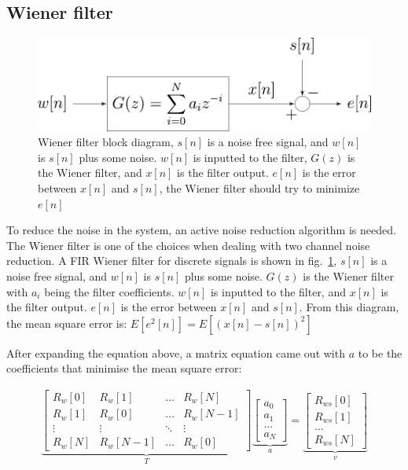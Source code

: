\subsection{Wiener filter}

\begin{figure}[H]
\centerline{\includegraphics[scale=0.5]{3-literature/Wiener_block.pdf}}
\caption{Wiener filter block diagram, $s[n]$ is a noise free signal, and $w[n]$ is $s[n]$ plus some noise.  $w[n]$ is inputted to the filter, $G(z)$ is the Wiener filter, and $x[n]$ is the filter output.  $e[n]$ is the error between $x[n]$ and $s[n]$, the Wiener filter should try to minimize $e[n]$}
\label{fig_Wiener_block}
\end{figure}

To reduce the noise in the system, an active noise reduction algorithm is needed.  The Wiener filter is one of the choices when dealing with two channel noise reduction.  A FIR Wiener filter for discrete signals \cite{WienerPaper} is shown in fig.~\ref{fig_Wiener_block}, $s[n]$ is a noise free signal, and $w[n]$ is $s[n]$ plus some noise.  $G(z)$ is the Wiener filter with $a_i$ being the filter coefficients.   $w[n]$ is inputted to the filter, and $x[n]$ is the filter output.  $e[n]$ is the error between $x[n]$ and $s[n]$.  From this diagram, the mean square error is:
$E[e^2 [n]]=E[(x[n]-s[n])^2]$

After expanding the equation above, a matrix equation came out with $a$ to be the coefficients that minimise the mean square error:


\begin{gather} \label{eqn_WienerMatrix}
\underbrace{
    \begin{bmatrix}
    R_w[0] & R_w[1] & \dots & R_w[N] \\
    R_w[1] & R_w[0] & \dots & R_w[N-1] \\
    \vdots & \vdots & \ddots & \vdots \\
    R_w[N] & R_w[N-1] & \dots & R_w[0]
    \end{bmatrix}
}_{T}
\underbrace{
    \begin{bmatrix}
    a_0 \\
    a_1 \\
    \dots \\
    a_N
    \end{bmatrix}
}_{a}
=
\underbrace{
    \begin{bmatrix}
    R_{ws}[0] \\
    R_{ws}[1] \\
    \dots \\
    R_{ws}[N]
    \end{bmatrix}
}_{v}
\end{gather}

